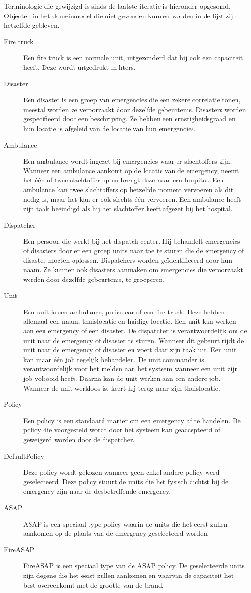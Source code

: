 \label{terminologie}
Terminologie die gewijzigd is sinds de laatste iteratie is hieronder opgesomd. Objecten in het domeinmodel die niet gevonden kunnen worden in de lijst zijn hetzelfde gebleven. 
\begin{description}
  \item[Fire truck] Een fire truck is een normale unit, uitgezonderd dat hij ook een capaciteit heeft. Deze wordt uitgedrukt in liters.
  \item[Disaster] Een disaster is een groep van emergencies die een zekere correlatie tonen, meestal worden ze veroorzaakt door dezelfde gebeurtenis. Disasters worden gespecifieerd door een beschrijving. Ze hebben een ernstigheidsgraad en hun locatie is afgeleid van de locatie van hun emergencies.
    \item[Ambulance] Een ambulance wordt ingezet bij emergencies waar er slachtoffers zijn. Wanneer een ambulance aankomt op de locatie van de emergency, neemt het \'e\'en of twee slachtoffer op en brengt deze naar een hospital. Een ambulance kan twee slachtoffers op hetzelfde moment vervoeren als dit nodig is, maar het kan er ook slechts \'e\'en vervoeren. Een ambulance heeft zijn taak be\"eindigd als hij het slachtoffer heeft afgezet bij het hospital.
    \item[Dispatcher] Een persoon die werkt bij het dispatch center. Hij behandelt emergencies of disasters door er een groep units naar toe te sturen die de emergency of disaster moeten oplossen. Dispatchers worden ge\"identificeerd door hun naam. Ze kunnen ook disasters aanmaken om emergencies die veroorzaakt werden door dezelfde gebeurtenis, te groeperen.
        \item[Unit] Een unit is een ambulance, police car of een fire truck. Deze hebben allemaal een naam, thuislocatie en huidige locatie. Een unit kan werken aan een emergency of een disaster. De dispatcher is verantwoordelijk om de unit naar de emergency of disaster te sturen. Wanneer dit gebeurt rijdt de unit naar de emergency of disaster en voert daar zijn taak uit. Een unit kan maar \'e\'en job tegelijk behandelen. De unit commander is verantwoordelijk voor het melden aan het systeem wanneer een unit zijn job voltooid heeft. Daarna kan de unit werken aan een andere job. Wanneer de unit werkloos is, keert hij terug naar zijn thuislocatie.
  \item[Policy]  Een policy is een standaard manier om een emergency af te handelen. De policy die voorgesteld wordt door het systeem kan geaccepteerd of geweigerd worden door de dispatcher.
  \item[DefaultPolicy] Deze policy wordt gekozen wanneer geen enkel andere policy werd geselecteerd. Deze policy stuurt de units die het fysisch dichtst bij de emergency zijn naar de desbetreffende emergency.
  \item[ASAP] ASAP is een speciaal type policy waarin de units die het eerst zullen aankomen op de plaats van de emergency geselecteerd worden.
  \item[FireASAP] FireASAP is een speciaal type van de ASAP policy. De geselecteerde units zijn degene die het eerst zullen aankomen en waarvan de capaciteit het best overeenkomt met de grootte van de brand.
\end{description}
